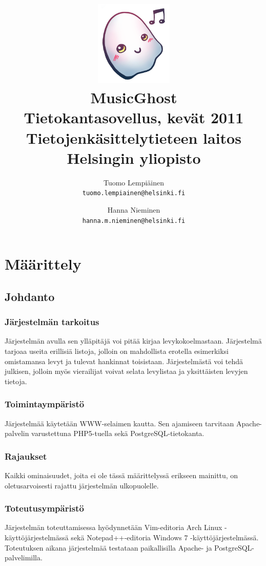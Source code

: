 \documentclass[a4paper,12pt]{report}
\title{\includegraphics[width=5em]{logo}\\\vspace{1em}MusicGhost\\\vspace{1em}
  \large{Tietokantasovellus, kevät 2011\\Tietojenkäsittelytieteen
  laitos\\Helsingin yliopisto}\\}
\author{Tuomo Lempiäinen\\\texttt{tuomo.lempiainen@helsinki.fi} \and
Hanna Nieminen\\\texttt{hanna.m.nieminen@helsinki.fi}}
\begin{document}
\maketitle

\tableofcontents

\chapter{Määrittely}

\section{Johdanto}

\subsection{Järjestelmän tarkoitus}

Järjestelmän avulla sen ylläpitäjä voi pitää kirjaa levykokoelmastaan.
Järjestelmä tarjoaa useita erillisiä listoja, jolloin on mahdollista
erotella esimerkiksi omistamansa levyt ja tulevat hankinnat toisistaan.
Järjestelmästä voi tehdä julkisen, jolloin myös vierailijat voivat selata
levylistaa ja yksittäisten levyjen tietoja.

\subsection{Toimintaympäristö}

Järjestelmää käytetään WWW-selaimen kautta. Sen ajamiseen tarvitaan
Apache-palvelin varustettuna PHP5-tuella sekä PostgreSQL-tietokanta.

\subsection{Rajaukset}

Kaikki ominaisuudet, joita ei ole tässä määrittelyssä erikseen mainittu, on
oletusarvoisesti rajattu järjestelmän ulkopuolelle.

\subsection{Toteutusympäristö}

Järjestelmän toteuttamisessa hyödynnetään Vim-editoria Arch Linux
-käyttöjärjestelmässä sekä Notepad++-editoria Windows 7
-käyttöjärjestelmässä. Toteutuksen aikana järjestelmää testataan
paikallisilla Apache- ja PostgreSQL-palvelimilla.
\end{document}
